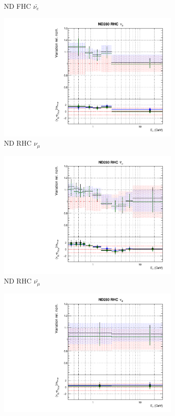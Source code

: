 \begin{figure}[!htbp]
\begin{subfigure}{0.45\textwidth}
  \caption{ND FHC $\bar{\nu_{e}}$}
\end{subfigure}
\begin{subfigure}{0.45\textwidth}
  \centering
  \includegraphics[width=0.75\linewidth]{figs/polydataflux_4}
  \caption{ND RHC $\nu_{\mu}$}
\end{subfigure}
\begin{subfigure}{0.45\textwidth}
  \centering
  \includegraphics[width=0.75\linewidth]{figs/polydataflux_5}
  \caption{ND RHC $\bar{\nu_{\mu}}$}
\end{subfigure}
\begin{subfigure}{0.45\textwidth}
  \centering
  \includegraphics[width=0.75\linewidth]{figs/polydataflux_6}

\end{subfigure}
\end{figure}
